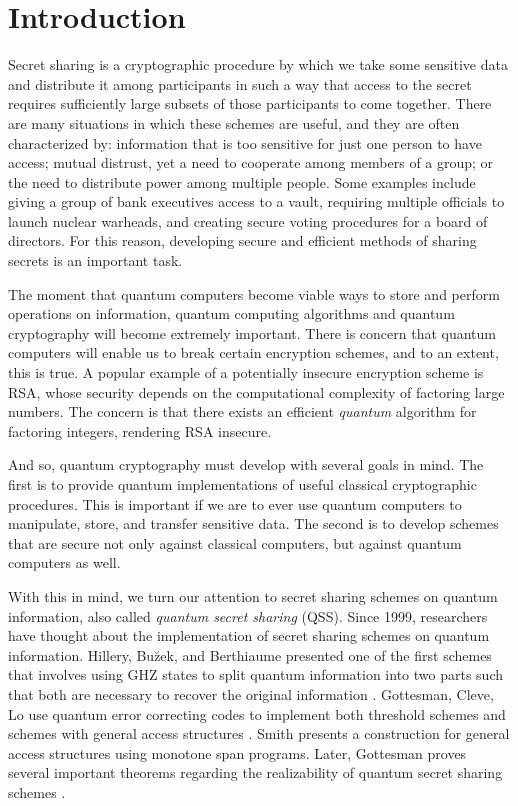 \chapter{Introduction}
\label{introduction}

Secret sharing is a cryptographic procedure by which we take some sensitive data and distribute it among participants in such a way that access to the secret requires sufficiently large subsets of those participants to come together. There are many situations in which these schemes are useful, and they are often characterized by: information that is too sensitive for just one person to have access; mutual distrust, yet a need to cooperate among members of a group; or the need to distribute power among multiple people. Some examples include giving a group of bank executives access to a vault, requiring multiple officials to launch nuclear warheads, and creating secure voting procedures for a board of directors. For this reason, developing secure and efficient methods of sharing secrets is an important task. 

The moment that quantum computers become viable ways to store and perform operations on information, quantum computing algorithms and quantum cryptography will become extremely important. There is concern that quantum computers will enable us to break certain encryption schemes, and to an extent, this is true. A popular example of a potentially insecure encryption scheme is RSA, whose security depends on the computational complexity of factoring large numbers. The concern is that there exists an efficient \textit{quantum} algorithm for factoring integers, rendering RSA insecure.

And so, quantum cryptography must develop with several goals in mind. The first is to provide quantum implementations of useful classical cryptographic procedures. This is important if we are to ever use quantum computers to manipulate, store, and transfer sensitive data. The second is to develop schemes that are secure not only against classical computers, but against quantum computers as well.

With this in mind, we turn our attention to secret sharing schemes on quantum information, also called \textit{quantum secret sharing} (QSS). Since 1999, researchers have thought about the implementation of secret sharing schemes on quantum information. Hillery, Bu\u{z}ek, and Berthiaume presented one of the first schemes that involves using GHZ states to split quantum information into two parts such that both are necessary to recover the original information \cite{hillery_quantum_1999}. Gottesman, Cleve, Lo use quantum error correcting codes to implement both threshold schemes and schemes with general access structures \cite{cleve_how_1999}. Smith presents a construction for general access structures using monotone span programs. Later, Gottesman proves several important theorems regarding the realizability of quantum secret sharing schemes \cite{singh_assisted_2004}.

